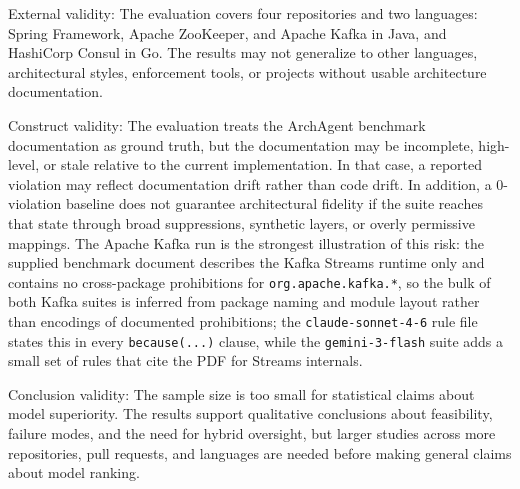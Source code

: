 \documentclass[sigconf,screen]{acmart}
\begin{document}
External validity: The evaluation covers four repositories and two languages: Spring Framework, Apache ZooKeeper, and Apache Kafka in Java, and HashiCorp Consul in Go. The results may not generalize to other languages, architectural styles, enforcement tools, or projects without usable architecture documentation.

Construct validity: The evaluation treats the ArchAgent benchmark documentation as ground truth, but the documentation may be incomplete, high-level, or stale relative to the current implementation. In that case, a reported violation may reflect documentation drift rather than code drift. In addition, a 0-violation baseline does not guarantee architectural fidelity if the suite reaches that state through broad suppressions, synthetic layers, or overly permissive mappings. The Apache Kafka run is the strongest illustration of this risk: the supplied benchmark document describes the Kafka Streams runtime only and contains no cross-package prohibitions for \texttt{org.apache.kafka.*}, so the bulk of both Kafka suites is inferred from package naming and module layout rather than encodings of documented prohibitions; the \texttt{claude-sonnet-4-6} rule file states this in every \texttt{because(...)} clause, while the \texttt{gemini-3-flash} suite adds a small set of rules that cite the PDF for Streams internals.

Conclusion validity: The sample size is too small for statistical claims about model superiority. The results support qualitative conclusions about feasibility, failure modes, and the need for hybrid oversight, but larger studies across more repositories, pull requests, and languages are needed before making general claims about model ranking.
\end{document}
